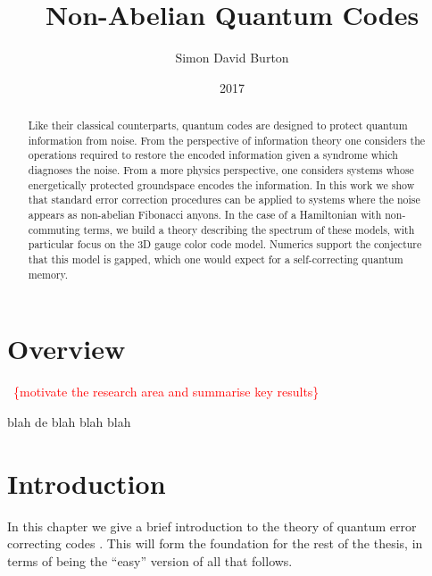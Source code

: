 \documentclass[11pt,oneside]{report}
\title{Non-Abelian Quantum Codes}
\author{Simon David Burton}
\date{2017}
\newcommand{\danbrowne}[1]{\ \textcolor{red}{\{#1\}}\ }
\begin{document}

\maketitle


\begin{abstract}
Like their classical counterparts,
quantum codes are designed to protect quantum
information from noise.
From the perspective of information theory
one considers the operations required to restore
the encoded information given a syndrome which
diagnoses the noise.
From a more physics perspective, one considers
systems whose energetically protected groundspace
encodes the information.
In this work we show that standard error correction
procedures can be applied to systems where the
noise appears as non-abelian Fibonacci anyons.
In the case of a Hamiltonian with non-commuting
terms, we build a theory describing the spectrum of
these models,  
with particular focus on the 3D gauge color code model.
Numerics support the conjecture that this model is gapped,
which one would expect for a self-correcting quantum memory.
\end{abstract}

\declaration
\attribution

\dedication{To Arina}

\tableofcontents
\newpage
{}

\setcounter{chapter}{-1}
\chapter{Overview}

\danbrowne{motivate the research area and summarise key results}

blah de blah blah blah

\chapter{Introduction}

%


In this chapter we give a brief introduction to
the theory of quantum error correcting codes \cite{Calderbank1997,Dennis2002}.
This will form the foundation for the rest of the thesis,
in terms of being the ``easy'' version of all that follows.
\end{document}
